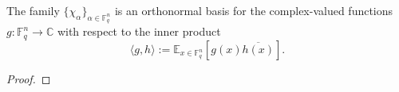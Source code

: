 \begin{theorem}
\label{lem:characters-orthonormal-basis}
\leanok
The family $\{\chi_\alpha\}_{\alpha \in \mathbb{F}_q^n}$ is
  an orthonormal basis for the complex-valued functions
  $g : \mathbb{F}_q^n \to \mathbb{C}$ with respect to the inner product
  \[
    \langle g,h\rangle := \mathbb{E}_{x \in \mathbb{F}_q^n}[g(x)\overline{h(x)}].
  \]
\end{theorem}
\begin{proof}
\end{proof}
